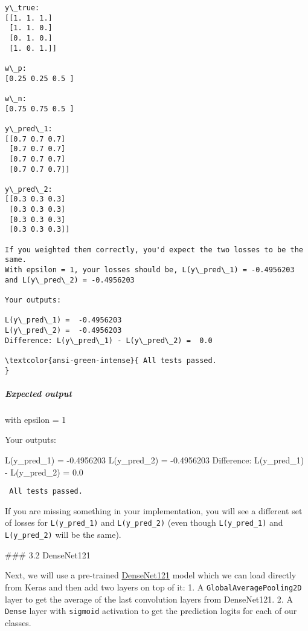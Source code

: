 \documentclass[11pt]{article}
\newenvironment{Shaded}{}{}
\newcommand{\FloatTok}[1]{\textcolor[rgb]{0.25,0.63,0.44}{{#1}}}
\newcommand{\NormalTok}[1]{{#1}}
\newcommand{\OperatorTok}[1]{\textcolor[rgb]{0.40,0.40,0.40}{{#1}}}
\begin{document}
    \begin{Verbatim}[commandchars=\\\{\}]
y\_true:
[[1. 1. 1.]
 [1. 1. 0.]
 [0. 1. 0.]
 [1. 0. 1.]]

w\_p:
[0.25 0.25 0.5 ]

w\_n:
[0.75 0.75 0.5 ]

y\_pred\_1:
[[0.7 0.7 0.7]
 [0.7 0.7 0.7]
 [0.7 0.7 0.7]
 [0.7 0.7 0.7]]

y\_pred\_2:
[[0.3 0.3 0.3]
 [0.3 0.3 0.3]
 [0.3 0.3 0.3]
 [0.3 0.3 0.3]]

If you weighted them correctly, you'd expect the two losses to be the same.
With epsilon = 1, your losses should be, L(y\_pred\_1) = -0.4956203 and L(y\_pred\_2) = -0.4956203

Your outputs:

L(y\_pred\_1) =  -0.4956203
L(y\_pred\_2) =  -0.4956203
Difference: L(y\_pred\_1) - L(y\_pred\_2) =  0.0 

\textcolor{ansi-green-intense}{ All tests passed.
}
    \end{Verbatim}

    \hypertarget{expected-output}{%
\subparagraph{Expected output}\label{expected-output}}

with epsilon = 1

\begin{Shaded}
\begin{Highlighting}[]
\NormalTok{Your outputs:}

\NormalTok{L(y_pred_1) }\OperatorTok{=}  \FloatTok{-0.4956203}
\NormalTok{L(y_pred_2) }\OperatorTok{=}  \FloatTok{-0.4956203}
\NormalTok{Difference: L(y_pred_1) }\OperatorTok{-}\NormalTok{ L(y_pred_2) }\OperatorTok{=}  \FloatTok{0.0} 
\end{Highlighting}
\end{Shaded}

\begin{verbatim}
 All tests passed.   
\end{verbatim}

If you are missing something in your implementation, you will see a
different set of losses for \texttt{L(y\_pred\_1)} and
\texttt{L(y\_pred\_2)} (even though \texttt{L(y\_pred\_1)} and
\texttt{L(y\_pred\_2)} will be the same).

     \#\#\# 3.2 DenseNet121

Next, we will use a pre-trained
\href{https://www.kaggle.com/pytorch/densenet121}{DenseNet121} model
which we can load directly from Keras and then add two layers on top of
it: 1. A \texttt{GlobalAveragePooling2D} layer to get the average of the
last convolution layers from DenseNet121. 2. A \texttt{Dense} layer with
\texttt{sigmoid} activation to get the prediction logits for each of our
classes.
\end{document}
